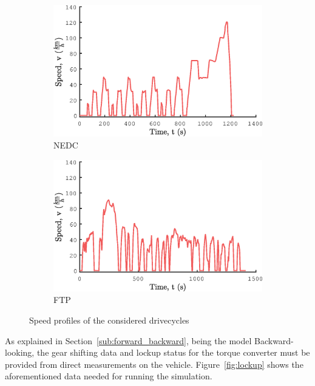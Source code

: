 \begin{figure}[ht]
  \centering
  \begin{subfigure}[b]{0.49\textwidth}
    \includegraphics[width=\textwidth]{figures/model/NEDC/speed.eps}
    \caption{NEDC}
    \label{fig:NEDC_speed_profile}
  \end{subfigure}
  \begin{subfigure}[b]{0.49\textwidth}
    \includegraphics[width=\textwidth]{figures/model/FTP/speed.eps}
    \caption{FTP}
    \label{fig:FTP_speed_profile}
  \end{subfigure}
  \caption{Speed profiles of the considered drivecycles}\label{fig:speed_profile}
\end{figure}

As explained in Section~\ref{sub:forward_backward}, being the model Backward-looking, the gear shifting data and lockup status for the torque converter must be provided from direct measurements on the vehicle. Figure~\ref{fig:lockup} shows the aforementioned data needed for running the simulation.

